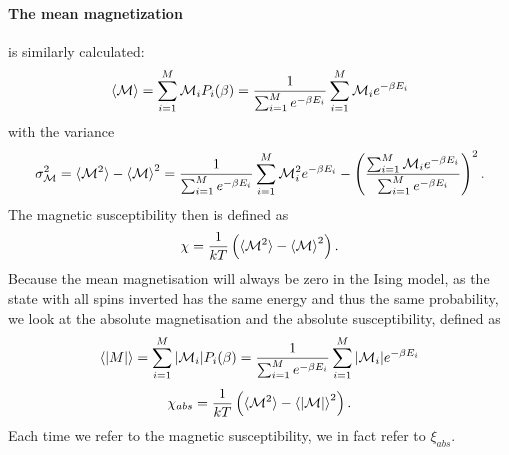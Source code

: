 \documentclass[10pt,a4paper]{article}
\begin{document}
\paragraph{The mean magnetization} is similarly calculated:
\begin{equation} \label{Mean magnetization definition equation}
 \braket{\mathcal{M}} = \sum_{i=1}^{M} \mathcal{M}_iP_i(\beta) = \frac{1}{\sum_{i=1}^M e^{-\beta E_i}} \sum_{i=1}^M \mathcal{M}_ie^{-\beta E_i}
\end{equation} 
with the variance
\begin{equation}
\sigma_\mathcal{M}^2 = \braket{\mathcal{M}^2}-\braket{\mathcal{M}}^2 = \frac{1}{\sum_{i=1}^M e^{-\beta E_i}} \sum_{i=1}^M \mathcal{M}_i^2e^{-\beta E_i} - \left( \frac{\sum_{i=1}^M \mathcal{M}_ie^{-\beta E_i}}{\sum_{i=1}^M e^{-\beta E_i}} \right)^2.
\end{equation}
The magnetic susceptibility then is defined as
\begin{equation}\label{Magnetic susceptibility definition equation}
\chi = \frac{1}{kT} \left( \braket{\mathcal{M}^2}-\braket{\mathcal{M}}^2 \right).
\end{equation}
Because the mean magnetisation will always be zero in the Ising model, as the state with all spins inverted has the same energy and thus the same probability, we look at the absolute magnetisation and the absolute susceptibility, defined as
\begin{equation} \label{Mean magnetization definition equation}
 \braket{|M|} = \sum_{i=1}^{M} |\mathcal{M}_i|P_i(\beta) = \frac{1}{\sum_{i=1}^M e^{-\beta E_i}} \sum_{i=1}^M |\mathcal{M}_i|e^{-\beta E_i}
\end{equation} 
\begin{equation}\label{Magnetic susceptibility definition equation}
\chi_{abs} = \frac{1}{kT} \left( \braket{\mathcal{M}^2}-\braket{|\mathcal{M}|}^2 \right).
\end{equation}
Each time we refer to the magnetic susceptibility, we in fact refer to $\xi_{abs}$.
\end{document}
